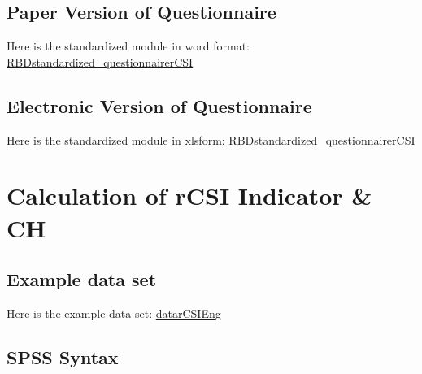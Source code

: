 \documentclass[
]{book}
\begin{document}
\hypertarget{paper-version-of-questionnaire-1}{%
\subsection{Paper Version of Questionnaire}\label{paper-version-of-questionnaire-1}}

Here is the standardized module in word format:
\href{https://github.com/WFP-VAM/RBD_FS_CH_guide_EN/blob/master/questionnaires/RBDstandardized_questionnairerCSI.docx}{RBDstandardized\_questionnairerCSI}

\hypertarget{electronic-version-of-questionnaire-1}{%
\subsection{Electronic Version of Questionnaire}\label{electronic-version-of-questionnaire-1}}

Here is the standardized module in xlsform:
\href{https://github.com/WFP-VAM/RBD_FS_CH_guide_EN/blob/master/questionnaires/RBDstandardized_questionnairerCSI.xlsx}{RBDstandardized\_questionnairerCSI}

\hypertarget{calculation-of-rcsi-indicator-ch}{%
\section{Calculation of rCSI Indicator \& CH}\label{calculation-of-rcsi-indicator-ch}}

\hypertarget{example-data-set-1}{%
\subsection{Example data set}\label{example-data-set-1}}

Here is the example data set:
\href{https://github.com/WFP-VAM/RBD_FS_CH_guide_EN/blob/master/example_datasets/datarCSIEng.sav}{datarCSIEng}

\hypertarget{spss-syntax-1}{%
\subsection{SPSS Syntax}\label{spss-syntax-1}}
\end{document}
